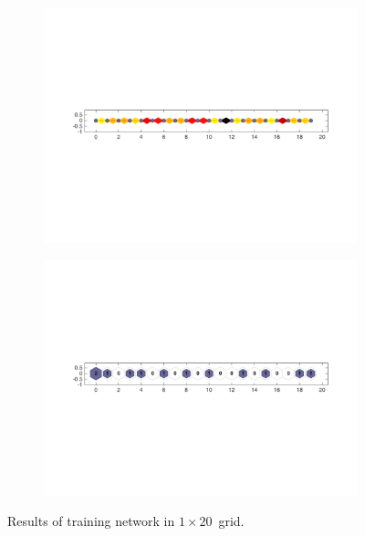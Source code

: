    \begin{figure}
        \begin{subfigure}[b]{0.5\textwidth}
            \centering
            \includegraphics[width=\textwidth]{../images/1d/apps/dist_1_by_20.png}
        \end{subfigure}
        \hfill
        \begin{subfigure}[b]{0.5\textwidth}
             \includegraphics[width=\textwidth]{../images/1d/apps/hit_t_1_by_20.png}
        \end{subfigure}
                \caption{Results of training network in $1\times20$~grid.}
         \label{fig: 1by20T}
    \end{figure}
    
